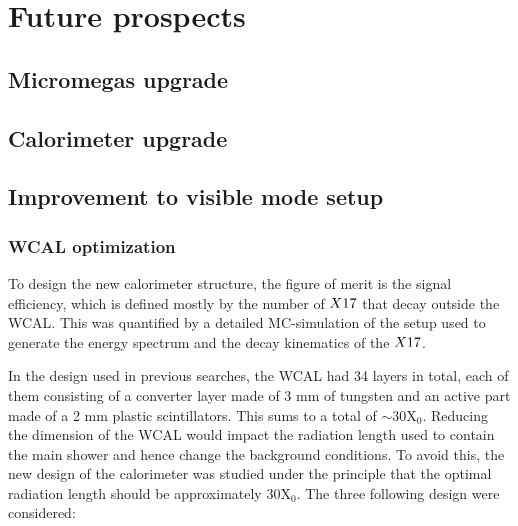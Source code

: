 
\newcommand{\pdirfive}{chapters/chapter5/plots}

\chapter{Future prospects} %
\label{chapter5} %


\section{Micromegas upgrade}
\label{chapter5:sec:mm-upgrades}

\section{Calorimeter upgrade}
\label{chapter5:sec:cal-upgrades}

\section{Improvement to visible mode setup}
\label{chapter5:sec:new-vismode-setup}

\subsection{WCAL optimization}
\label{chapter5:sec:new-vismode-setup-wcal}

To design the new calorimeter structure, the figure of merit is the signal efficiency, which is defined mostly by the number of $X17$ that decay outside the WCAL. This was quantified by a detailed MC-simulation of the setup used to generate the energy spectrum and the decay kinematics of the $X17$.

In the design used in previous searches, the WCAL had 34 layers in total, each of them consisting of a converter layer made of 3 mm of tungsten and an active part made of a 2 mm plastic scintillators. This sums to a total of $\sim$30X$_0$. Reducing the dimension of the WCAL would impact the radiation length used to contain the main shower and hence change the background conditions. To avoid this, the new design of the calorimeter was studied under the principle that the optimal radiation length should be approximately 30X$_0$. The three following design were considered:

